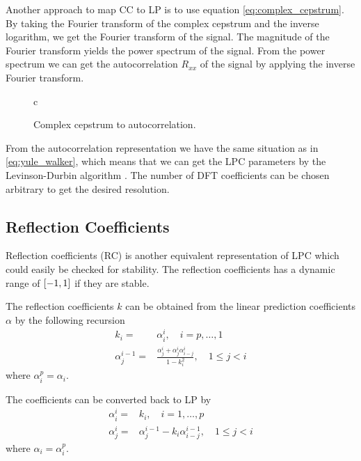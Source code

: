 Another approach to map CC to LP is to use equation \eqref{eq:complex_cepstrum}. By taking the Fourier transform of the complex cepstrum and the inverse logarithm, we get the Fourier transform of the signal. The magnitude of the Fourier transform yields the power spectrum of the signal. From the power spectrum we can get the autocorrelation $R_{xx}$ of the signal by applying the inverse Fourier transform.
\begin{figure}[htbp]
  \centering
  \begin{tabular}[h]{c}
  \end{tabular}
  \caption{Complex cepstrum to autocorrelation.}
  \label{fig:cc2ar}
\end{figure}
From the autocorrelation representation we have the same situation as in \eqref{eq:yule_walker}, which means that we can get the LPC parameters by the Levinson-Durbin algorithm \cite{cybenko80}. The number of DFT coefficients can be chosen arbitrary to get the desired resolution.

\subsection{Reflection Coefficients} %
\label{sub:reflection_coefficients}
Reflection coefficients (RC) is another equivalent representation of LPC which could easily be checked for stability. The reflection coefficients has a dynamic range of $\left[-1,1\right]$ if they are stable. 

The reflection coefficients $k$ can be obtained from the linear prediction coefficients $\alpha$ by the following recursion
\begin{equation}
	\label{eq:ar2rf}
	\begin{split}
		k_i = & \alpha_i^i, \quad i=p,\dotsc,1 \\
		\alpha_j^{i-1} = & \frac{\alpha_j^i+\alpha_j^i \alpha_{i-j}^i}{1-k_i^2}, \quad 1\leq j<i
	\end{split}
\end{equation}
where $\alpha_i^p=\alpha_i$.

The coefficients can be converted back to LP by \cite{taletek}
\begin{equation}
	\label{eq:rf2ar}
	\begin{split}
		\alpha_i^i = & k_i, \quad i=1,\dotsc,p \\
		\alpha_j^i = & \alpha_j^{i-1}-k_i \alpha_{i-j}^{i-1}, \quad 1\leq j<i
	\end{split}
\end{equation}
where $\alpha_i=\alpha_i^p$.

